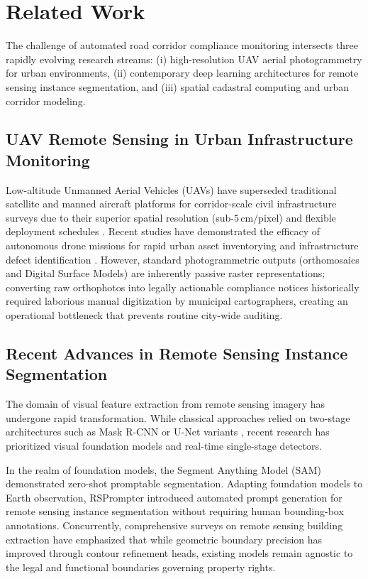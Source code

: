 \documentclass[conference]{IEEEtran}
\begin{document}
\section{Related Work}
The challenge of automated road corridor compliance monitoring intersects three rapidly evolving research streams: (i) high-resolution UAV aerial photogrammetry for urban environments, (ii) contemporary deep learning architectures for remote sensing instance segmentation, and (iii) spatial cadastral computing and urban corridor modeling.

\subsection{UAV Remote Sensing in Urban Infrastructure Monitoring}
Low-altitude Unmanned Aerial Vehicles (UAVs) have superseded traditional satellite and manned aircraft platforms for corridor-scale civil infrastructure surveys due to their superior spatial resolution (sub-$5\,\text{cm/pixel}$) and flexible deployment schedules \cite{colomina2014unmanned, nex2014uav}. Recent studies have demonstrated the efficacy of autonomous drone missions for rapid urban asset inventorying and infrastructure defect identification \cite{chen2024autonomous}. However, standard photogrammetric outputs (orthomosaics and Digital Surface Models) are inherently passive raster representations; converting raw orthophotos into legally actionable compliance notices historically required laborious manual digitization by municipal cartographers, creating an operational bottleneck that prevents routine city-wide auditing.

\subsection{Recent Advances in Remote Sensing Instance Segmentation}
The domain of visual feature extraction from remote sensing imagery has undergone rapid transformation. While classical approaches relied on two-stage architectures such as Mask R-CNN \cite{he2017mask} or U-Net variants \cite{ronneberger2015u}, recent research has prioritized visual foundation models and real-time single-stage detectors.

In the realm of foundation models, the Segment Anything Model (SAM) \cite{kirillov2024segment} demonstrated zero-shot promptable segmentation. Adapting foundation models to Earth observation, RSPrompter \cite{chen2024rsprompter} introduced automated prompt generation for remote sensing instance segmentation without requiring human bounding-box annotations. Concurrently, comprehensive surveys on remote sensing building extraction \cite{li2024review} have emphasized that while geometric boundary precision has improved through contour refinement heads, existing models remain agnostic to the legal and functional boundaries governing property rights.
\end{document}

